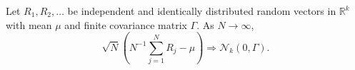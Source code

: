 Let \(R_1,R_2,\ldots\) be independent and identically distributed random
vectors in \(\mathbb R^k\) with mean \(\mu\) and finite covariance matrix
\(\Gamma\).  As \(N\to\infty\),
\[
\sqrt N\left(N^{-1}\sum_{j=1}^N R_j-\mu\right)
\Rightarrow\mathcal N_k(0,\Gamma).
\]